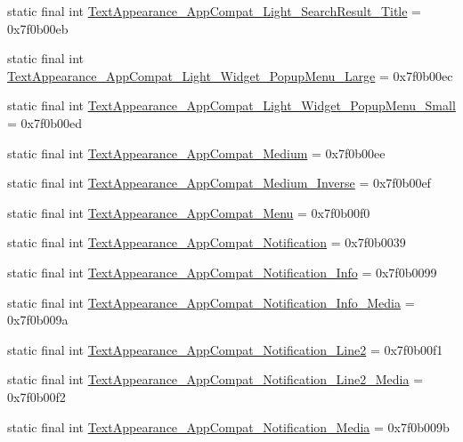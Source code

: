 \begin{CompactItemize}
\item 
static final int \hyperlink{classandroid_1_1support_1_1v4_1_1_r_1_1style_0d061d0caf7121c98689db6449b632f7}{TextAppearance\_\-AppCompat\_\-Light\_\-SearchResult\_\-Title} = 0x7f0b00eb
\item 
static final int \hyperlink{classandroid_1_1support_1_1v4_1_1_r_1_1style_f8fbc39bc3b421ca597a7589d38efe01}{TextAppearance\_\-AppCompat\_\-Light\_\-Widget\_\-PopupMenu\_\-Large} = 0x7f0b00ec
\item 
static final int \hyperlink{classandroid_1_1support_1_1v4_1_1_r_1_1style_83380b0cde4b6ce523537b956661fd20}{TextAppearance\_\-AppCompat\_\-Light\_\-Widget\_\-PopupMenu\_\-Small} = 0x7f0b00ed
\item 
static final int \hyperlink{classandroid_1_1support_1_1v4_1_1_r_1_1style_28dcb3c029c8e2602198a40befbca7f1}{TextAppearance\_\-AppCompat\_\-Medium} = 0x7f0b00ee
\item 
static final int \hyperlink{classandroid_1_1support_1_1v4_1_1_r_1_1style_ee69ebd722b54e01019618cfd7432ee3}{TextAppearance\_\-AppCompat\_\-Medium\_\-Inverse} = 0x7f0b00ef
\item 
static final int \hyperlink{classandroid_1_1support_1_1v4_1_1_r_1_1style_e7ffffed9f6451229d4ceb1bb9e215c2}{TextAppearance\_\-AppCompat\_\-Menu} = 0x7f0b00f0
\item 
static final int \hyperlink{classandroid_1_1support_1_1v4_1_1_r_1_1style_ba98972f44d614519c3fe712187b6692}{TextAppearance\_\-AppCompat\_\-Notification} = 0x7f0b0039
\item 
static final int \hyperlink{classandroid_1_1support_1_1v4_1_1_r_1_1style_3ede83f6fc99fc19eb6d7c70997e09a0}{TextAppearance\_\-AppCompat\_\-Notification\_\-Info} = 0x7f0b0099
\item 
static final int \hyperlink{classandroid_1_1support_1_1v4_1_1_r_1_1style_712dd50a6d89eaf792188b0dbd76680f}{TextAppearance\_\-AppCompat\_\-Notification\_\-Info\_\-Media} = 0x7f0b009a
\item 
static final int \hyperlink{classandroid_1_1support_1_1v4_1_1_r_1_1style_8a7357ad658446d7ecb0792a55b5ff24}{TextAppearance\_\-AppCompat\_\-Notification\_\-Line2} = 0x7f0b00f1
\item 
static final int \hyperlink{classandroid_1_1support_1_1v4_1_1_r_1_1style_ff80a90fa36507bc488726ad21099330}{TextAppearance\_\-AppCompat\_\-Notification\_\-Line2\_\-Media} = 0x7f0b00f2
\item 
static final int \hyperlink{classandroid_1_1support_1_1v4_1_1_r_1_1style_698960fe895edcb168cbb6d1f28b5527}{TextAppearance\_\-AppCompat\_\-Notification\_\-Media} = 0x7f0b009b

\end{CompactItemize}
